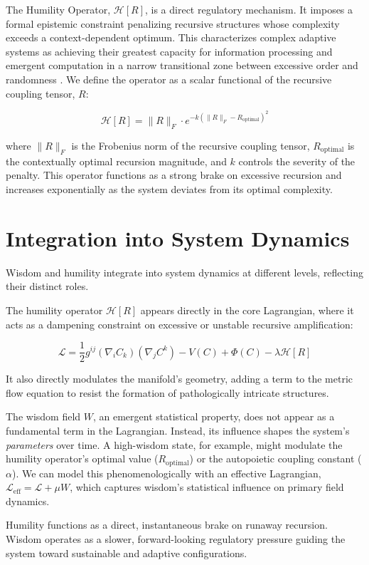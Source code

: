The Humility Operator, \(\mathcal{H}[R]\), is a direct regulatory mechanism. It imposes a formal epistemic constraint penalizing recursive structures whose complexity exceeds a context-dependent optimum. This characterizes complex adaptive systems as achieving their greatest capacity for information processing and emergent computation in a narrow transitional zone between excessive order and randomness \autocite{Langton1990}. We define the operator as a scalar functional of the recursive coupling tensor, \(R\):

\begin{equation}
\mathcal{H}[R] = \|R\|_F \cdot e^{-k(\|R\|_F - R_{\text{optimal}})^2}
\end{equation}

where \(\|R\|_F\) is the Frobenius norm of the recursive coupling tensor, \(R_{\text{optimal}}\) is the contextually optimal recursion magnitude, and \(k\) controls the severity of the penalty. This operator functions as a strong brake on excessive recursion and increases exponentially as the system deviates from its optimal complexity.


\section{Integration into System Dynamics}
\label{sec:integration_into_system_dynamics}

Wisdom and humility integrate into system dynamics at different levels, reflecting their distinct roles.

The humility operator \(\mathcal{H}[R]\) appears directly in the core Lagrangian, where it acts as a dampening constraint on excessive or unstable recursive amplification:

\begin{equation}
\mathcal{L} = \frac{1}{2} g^{ij} (\nabla_i C_k)(\nabla_j C^k) - V(C) + \Phi(C) - \lambda \mathcal{H}[R]
\end{equation}

It also directly modulates the manifold's geometry, adding a term to the metric flow equation to resist the formation of pathologically intricate structures.

The wisdom field \(W\), an emergent statistical property, does not appear as a fundamental term in the Lagrangian. Instead, its influence shapes the system's \textit{parameters} over time. A high-wisdom state, for example, might modulate the humility operator's optimal value (\(R_{\text{optimal}}\)) or the autopoietic coupling constant (\(\alpha\)). We can model this phenomenologically with an effective Lagrangian, \(\mathcal{L}_{\text{eff}} = \mathcal{L} + \mu W\), which captures wisdom's statistical influence on primary field dynamics.

Humility functions as a direct, instantaneous brake on runaway recursion. Wisdom operates as a slower, forward-looking regulatory pressure guiding the system toward sustainable and adaptive configurations.